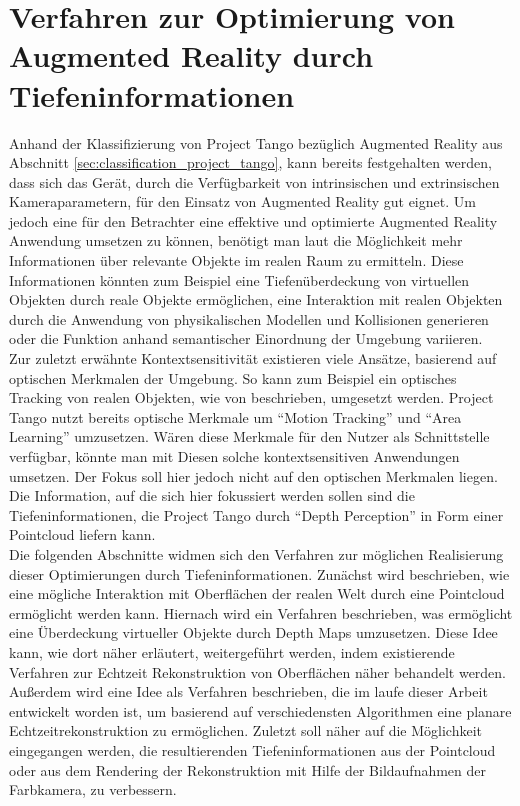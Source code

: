 \chapter{Verfahren zur Optimierung von Augmented Reality durch Tiefeninformationen} \label{sec:optimization}

Anhand der Klassifizierung von Project Tango bezüglich Augmented Reality aus Abschnitt \ref{sec:classification_project_tango}, kann bereits festgehalten werden, dass sich das Gerät, durch die Verfügbarkeit von intrinsischen und extrinsischen Kameraparametern, für den Einsatz von Augmented Reality gut eignet. Um jedoch eine für den Betrachter eine effektive und optimierte Augmented Reality Anwendung umsetzen zu können, benötigt man laut \citet{azuma2001recent} die Möglichkeit mehr Informationen über relevante Objekte im realen Raum zu ermitteln. Diese Informationen könnten zum Beispiel eine Tiefenüberdeckung von virtuellen Objekten durch reale Objekte ermöglichen, eine Interaktion mit realen Objekten durch die Anwendung von physikalischen Modellen und Kollisionen generieren oder die Funktion anhand semantischer Einordnung der Umgebung variieren. \\

Zur zuletzt erwähnte Kontextsensitivität existieren viele Ansätze, basierend auf optischen Merkmalen der Umgebung. So kann zum Beispiel ein optisches Tracking von realen Objekten, wie von \citet{lee2008hybrid} beschrieben, umgesetzt werden. Project Tango nutzt bereits optische Merkmale um \enquote{Motion Tracking} und \enquote{Area Learning} umzusetzen. Wären diese Merkmale für den Nutzer als Schnittstelle verfügbar, könnte man mit Diesen solche kontextsensitiven Anwendungen umsetzen. Der Fokus soll hier jedoch nicht auf den optischen Merkmalen liegen. Die Information, auf die sich hier fokussiert werden sollen sind die Tiefeninformationen, die Project Tango durch \enquote{Depth Perception} in Form einer Pointcloud liefern kann.\\

Die folgenden Abschnitte widmen sich den Verfahren zur möglichen Realisierung dieser Optimierungen durch Tiefeninformationen. Zunächst wird beschrieben, wie eine mögliche Interaktion mit Oberflächen der realen Welt durch eine Pointcloud ermöglicht werden kann. Hiernach wird ein Verfahren beschrieben, was ermöglicht eine Überdeckung virtueller Objekte durch Depth Maps umzusetzen. Diese Idee kann, wie dort näher erläutert, weitergeführt werden, indem existierende Verfahren zur Echtzeit Rekonstruktion von Oberflächen näher behandelt werden. Außerdem wird eine Idee als Verfahren beschrieben, die im laufe dieser Arbeit entwickelt worden ist, um basierend auf verschiedensten Algorithmen eine planare Echtzeitrekonstruktion zu ermöglichen. Zuletzt soll näher auf die Möglichkeit eingegangen werden, die resultierenden Tiefeninformationen aus der Pointcloud oder aus dem Rendering der Rekonstruktion mit Hilfe der Bildaufnahmen der Farbkamera, zu verbessern. \\

